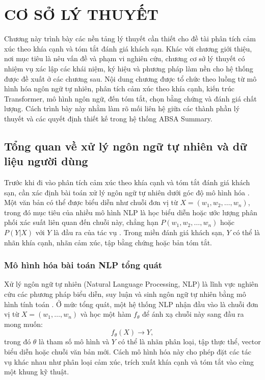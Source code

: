\chapter{CƠ SỞ LÝ THUYẾT}
\label{chap:co-so-ly-thuyet}

Chương này trình bày các nền tảng lý thuyết cần thiết cho đề tài phân tích cảm xúc theo khía cạnh và tóm tắt đánh giá khách sạn. Khác với chương giới thiệu, nơi mục tiêu là nêu vấn đề và phạm vi nghiên cứu, chương cơ sở lý thuyết có nhiệm vụ xác lập các khái niệm, ký hiệu và phương pháp làm nền cho hệ thống được đề xuất ở các chương sau. Nội dung chương được tổ chức theo luồng từ mô hình hóa ngôn ngữ tự nhiên, phân tích cảm xúc theo khía cạnh, kiến trúc Transformer, mô hình ngôn ngữ, đến tóm tắt, chọn bằng chứng và đánh giá chất lượng. Cách trình bày này nhằm làm rõ mối liên hệ giữa các thành phần lý thuyết và các quyết định thiết kế trong hệ thống ABSA Summary.
\section{Tổng quan về xử lý ngôn ngữ tự nhiên và dữ liệu người dùng}
\label{sec:chap2-nlp-overview}

Trước khi đi vào phân tích cảm xúc theo khía cạnh và tóm tắt đánh giá khách sạn, cần xác định bài toán xử lý ngôn ngữ tự nhiên dưới góc độ mô hình hóa \cite{jurafsky2000speech}. Một văn bản có thể được biểu diễn như chuỗi đơn vị từ $X=(w_1,w_2,\ldots,w_n)$, trong đó mục tiêu của nhiều mô hình NLP là học biểu diễn hoặc ước lượng phân phối xác suất liên quan đến chuỗi này, chẳng hạn $P(w_1,w_2,\ldots,w_n)$ hoặc $P(Y|X)$ với $Y$ là đầu ra của tác vụ \cite{manning1999foundations}. Trong miền đánh giá khách sạn, $Y$ có thể là nhãn khía cạnh, nhãn cảm xúc, tập bằng chứng hoặc bản tóm tắt.

\subsection{Mô hình hóa bài toán NLP tổng quát}
\label{subsec:chap2-nlp-concept}

Xử lý ngôn ngữ tự nhiên (Natural Language Processing, NLP) là lĩnh vực nghiên cứu các phương pháp biểu diễn, suy luận và sinh ngôn ngữ tự nhiên bằng mô hình tính toán \cite{jurafsky2000speech}. Ở mức tổng quát, một hệ thống NLP nhận đầu vào là chuỗi đơn vị từ $X=(w_1,\ldots,w_n)$ và học một hàm $f_\theta$ để ánh xạ chuỗi này sang đầu ra mong muốn:
\begin{equation}
f_\theta(X) \rightarrow Y,
\label{eq:chap2-nlp-task}
\end{equation}
trong đó $\theta$ là tham số mô hình và $Y$ có thể là nhãn phân loại, tập thực thể, vector biểu diễn hoặc chuỗi văn bản mới. Cách mô hình hóa này cho phép đặt các tác vụ khác nhau như phân loại cảm xúc, trích xuất khía cạnh và tóm tắt vào cùng một khung kỹ thuật.

